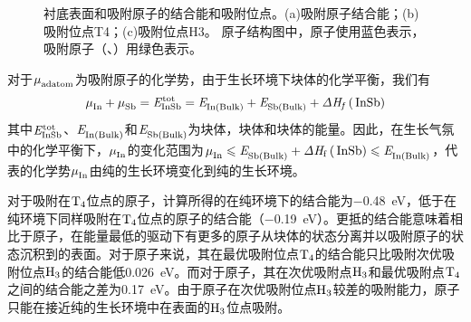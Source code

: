 \begin{figure}[htb]
{    }
    \caption{衬底表面和吸附原子的结合能和吸附位点。(a)吸附原子结合能；(b)吸附位点T4；(c)吸附位点H3。 原子结构图中，原子使用蓝色表示，吸附原子（、）用绿色表示。}
    \label{fig:IS_Bi_adatoms}
\end{figure}

对于$\it \mu_{\rm adatom}^{\rm } \it$为吸附原子的化学势，由于生长环境下块体的化学平衡，我们有\chinesecolon
\begin{equation}
    \label{eq:IS_bulkEqmb}
    \muVar{In}{}+\muVar{Sb}{}=\energyVar{InSb}{tot}=\energyVar{In\left(Bulk\right)}{}+\energyVar{Sb\left(Bulk\right)}{}+\Delta H_{f}\left(\cemb{InSb}\right)
\end{equation}
其中$\it E_{\rm InSb}^{\rm tot} \it$、$\it E_{\rm In\left(Bulk\right)}^{\rm } \it$和$\it E_{\rm Sb\left(Bulk\right)}^{\rm } \it$为块体，块体和块体的能量。因此，在生长气氛中的化学平衡下，$\it \mu_{\rm In}^{\rm } \it$的变化范围为$\muVar{In}{}\leqslant \energyVar{Sb\left(Bulk\right)}{}+\Delta H_{\rm f}\left(\cemb{InSb}\right) \leqslant \energyVar{In\left(Bulk\right)}{}$，代表的化学势$\it \mu_{\rm In}^{\rm } \it$由纯的生长环境变化到纯的生长环境。

对于吸附在$\rm T_{4} \it$位点的原子，计算所得的在纯环境下的结合能为\SI{-0.48}{\electronvolt}，低于在纯环境下同样吸附在$\rm T_{4} \it$位点的原子的结合能（\SI{-0.19}{\electronvolt}）。更抵的结合能意味着相比于原子，在能量最低的驱动下有更多的原子从块体的状态分离并以吸附原子的状态沉积到的表面。对于原子来说，其在最优吸附位点$\rm T_{4} \it$的结合能只比吸附次优吸附位点$\rm H_{3} \it$的结合能低\SI{0.026}{\electronvolt}。而对于原子，其在次优吸附点$\rm H_{3} \it$和最优吸附点$\rm T_{4} \it$之间的结合能之差为\SI{0.17}{\electronvolt}。由于原子在次优吸附位点$\rm H_{3} \it$较差的吸附能力，原子只能在接近纯的生长环境中在表面的$\rm H_{3} \it$位点吸附。

